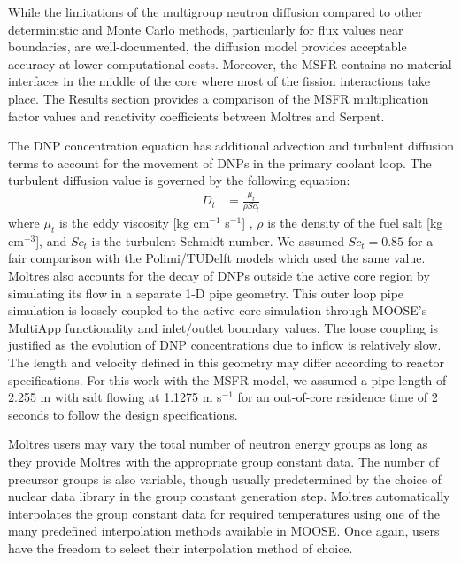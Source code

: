 While the limitations of the multigroup neutron diffusion compared to other
deterministic and Monte Carlo methods, particularly for flux values near
boundaries, are well-documented, the diffusion model provides acceptable
accuracy at lower computational costs. Moreover, the
\gls{MSFR} contains no material interfaces in the middle of the core where
most of the fission interactions take place. The Results section provides a
comparison of the \gls{MSFR} multiplication factor values and reactivity
coefficients between Moltres and Serpent.

The \gls{DNP} concentration equation has additional advection and turbulent
diffusion terms to account for the movement of \glspl{DNP} in the primary
coolant loop. The turbulent diffusion value is governed by the following
equation:
%
\begin{align}
    D_t &= \frac{\mu_t}{\rho Sc_t}
\end{align}
%
where $\mu_t$ is the eddy viscosity [kg cm$^{-1}$ s$^{-1}$] , $\rho$ is the
density of the fuel salt [kg cm$^{-3}$], and $Sc_t$ is the turbulent Schmidt
number. We assumed $Sc_t = 0.85$ for a fair comparison with the Polimi/TUDelft
models which used the same value. Moltres also accounts for the decay of
\glspl{DNP} outside the active core region by simulating its flow in a
separate 1-D pipe geometry. This outer loop pipe simulation is loosely coupled
to the active core simulation through MOOSE's MultiApp functionality and
inlet/outlet boundary values. The loose coupling is justified as the evolution
of \gls{DNP} concentrations due to inflow is relatively slow. The length and
velocity defined in this geometry may differ according to reactor
specifications. For this work with the \gls{MSFR} model, we assumed a pipe
length of 2.255 m with salt flowing at 1.1275 m s$^{-1}$ for an out-of-core
residence time of 2 seconds to follow the design specifications.

Moltres users may vary the total number of neutron energy groups as
long as they provide Moltres with the appropriate group constant data. The
number of precursor groups is also variable, though usually predetermined by
the choice of nuclear data library in the group constant generation step.
Moltres automatically interpolates the group constant data for required
temperatures using one of the many predefined interpolation methods available
in \gls{MOOSE}. Once again, users have the freedom to select their
interpolation method of choice.

